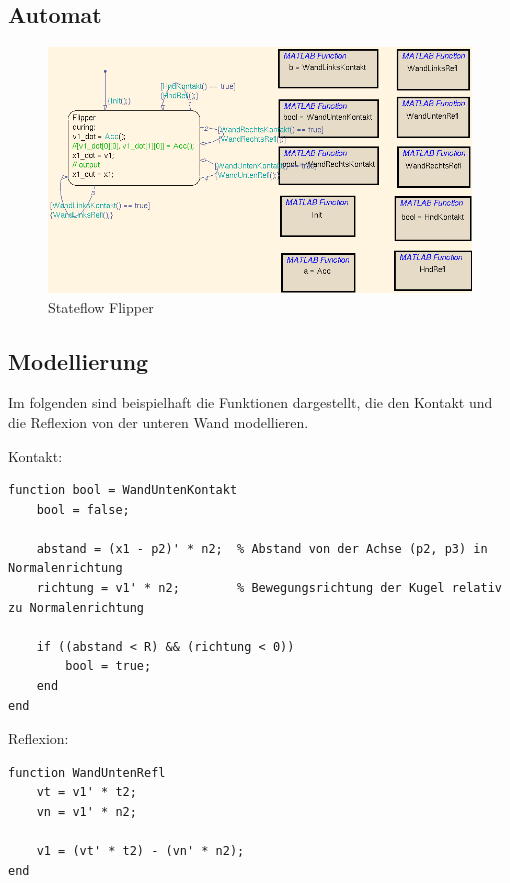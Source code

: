 \documentclass[10pt]{scrartcl}
\begin{document}
	\subsection{Automat}	
	\begin{figure}[htbp]
		\centering
		\includegraphics[scale=0.55]{ScreenshotFlipperAutomat.png}
		\caption{Stateflow Flipper}
		\label{pic:stateflowFlipper}
	\end{figure}
		
	\subsection{Modellierung}
	Im folgenden sind beispielhaft die Funktionen dargestellt, die den Kontakt und die Reflexion von der unteren Wand modellieren.
	
	Kontakt:
	\begin{lstlisting}[tabsize=2, frame=single, label=Stiff, caption={WandUntenKontakt}]
	function bool = WandUntenKontakt
    bool = false;
    
    abstand = (x1 - p2)' * n2;  % Abstand von der Achse (p2, p3) in Normalenrichtung
    richtung = v1' * n2;        % Bewegungsrichtung der Kugel relativ zu Normalenrichtung
    
    if ((abstand < R) && (richtung < 0))
        bool = true;
    end
end
	\end{lstlisting}		

Reflexion:
\begin{lstlisting}[tabsize=2, frame=single, label=Stiff, caption={WandUntenReflexion}]
	function WandUntenRefl
    vt = v1' * t2;
    vn = v1' * n2;
    
    v1 = (vt' * t2) - (vn' * n2);
end
	\end{lstlisting}
\end{document}
